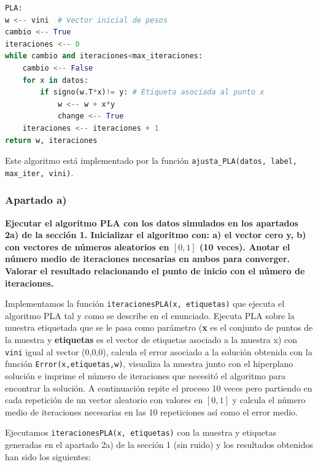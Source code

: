 \documentclass[a4]{article}
\begin{document}
\begin{lstlisting}[language=Python]
PLA:
w <-- vini  # Vector inicial de pesos
cambio <-- True
iteraciones <-- 0
while cambio and iteraciones<max_iteraciones:
	cambio <-- False
	for x in datos:
		if signo(w.T*x)!= y: # Etiqueta asociada al punto x
			w <-- w + x*y
			change <-- True
	iteraciones <-- iteraciones + 1
return w, iteraciones

\end{lstlisting}

Este algoritmo está implementado por la función \lstinline|ajusta_PLA(datos, label, max_iter, vini)|. 


\subsubsection{Apartado a)}
  
\textbf{Ejecutar el algoritmo PLA con los datos simulados en los apartados 2a) de la
sección 1. Inicializar el algoritmo con: a) el vector cero y, b) con vectores de
números aleatorios en $ [0, 1] $ (10 veces). Anotar el número medio de iteraciones
necesarias en ambos para converger. Valorar el resultado relacionando el punto
de inicio con el número de iteraciones.
}

Implementamos la función \lstinline|iteracionesPLA(x, etiquetas)| que ejecuta el algoritmo PLA tal y como se describe en el enunciado. Ejecuta PLA sobre la muestra etiquetada que se le pasa como parámetro (\textbf{x} es el conjunto de puntos de la muestra y \textbf{etiquetas} es el vector de etiquetas asociado a la muestra x) con \lstinline|vini| igual al vector (0,0,0), calcula el error asociado a la solución obtenida con la función \lstinline|Error(x,etiquetas,w)|, visualiza la muestra junto con el hiperplano solución e imprime el número de iteraciones que necesitó el algoritmo para encontrar la solución. A continuación repite el proceso 10 veces pero partiendo en cada repetición de un vector aleatorio con valores en $ [0, 1] $ y calcula el número medio de iteraciones necesarias en las 10 repeticiones así como el error medio. 

Ejecutamos \lstinline|iteracionesPLA(x, etiquetas)| con la muestra y etiquetas generadas en el apartado 2a) de la sección 1 (sin ruido) y los resultados obtenidos han sido los siguientes:
\end{document}
